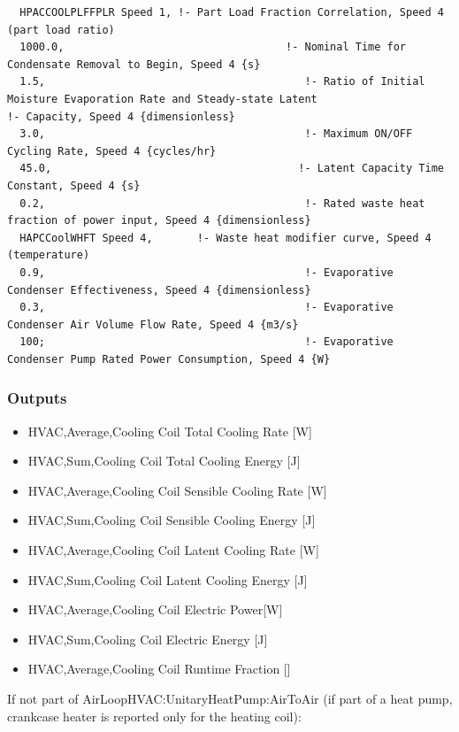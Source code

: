 \begin{lstlisting}
  HPACCOOLPLFFPLR Speed 1, !- Part Load Fraction Correlation, Speed 4 (part load ratio)
  1000.0,                                   !- Nominal Time for Condensate Removal to Begin, Speed 4 {s}
  1.5,                                         !- Ratio of Initial Moisture Evaporation Rate and Steady-state Latent                                                     !- Capacity, Speed 4 {dimensionless}
  3.0,                                         !- Maximum ON/OFF Cycling Rate, Speed 4 {cycles/hr}
  45.0,                                       !- Latent Capacity Time Constant, Speed 4 {s}
  0.2,                                         !- Rated waste heat fraction of power input, Speed 4 {dimensionless}
  HAPCCoolWHFT Speed 4,       !- Waste heat modifier curve, Speed 4 (temperature)
  0.9,                                         !- Evaporative Condenser Effectiveness, Speed 4 {dimensionless}
  0.3,                                         !- Evaporative Condenser Air Volume Flow Rate, Speed 4 {m3/s}
  100;                                         !- Evaporative Condenser Pump Rated Power Consumption, Speed 4 {W}
\end{lstlisting}

\subsubsection{Outputs}\label{outputs-12-002}

\begin{itemize}
\item
  HVAC,Average,Cooling Coil Total Cooling Rate {[}W{]}
\item
  HVAC,Sum,Cooling Coil Total Cooling Energy {[}J{]}
\item
  HVAC,Average,Cooling Coil Sensible Cooling Rate {[}W{]}
\item
  HVAC,Sum,Cooling Coil Sensible Cooling Energy {[}J{]}
\item
  HVAC,Average,Cooling Coil Latent Cooling Rate {[}W{]}
\item
  HVAC,Sum,Cooling Coil Latent Cooling Energy {[}J{]}
\item
  HVAC,Average,Cooling Coil Electric Power{[}W{]}
\item
  HVAC,Sum,Cooling Coil Electric Energy {[}J{]}
\item
  HVAC,Average,Cooling Coil Runtime Fraction {[]}
\end{itemize}

If not part of AirLoopHVAC:UnitaryHeatPump:AirToAir (if part of a heat pump, crankcase heater is reported only for the heating coil):


